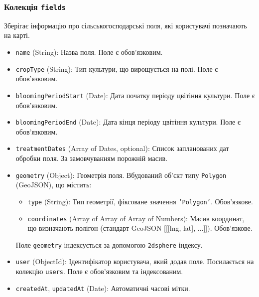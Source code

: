 \subsubsection*{Колекція \texttt{fields}}
Зберігає інформацію про сільськогосподарські поля, які користувачі позначають на карті.
\begin{itemize}
    \item \texttt{name} (String): Назва поля. Поле є обов'язковим.
    \item \texttt{cropType} (String): Тип культури, що вирощується на полі. Поле є обов'язковим.
    \item \texttt{bloomingPeriodStart} (Date): Дата початку періоду цвітіння культури. Поле є обов'язковим.
    \item \texttt{bloomingPeriodEnd} (Date): Дата кінця періоду цвітіння культури. Поле є обов'язковим.
    \item \texttt{treatmentDates} (Array of Dates, optional): Список запланованих дат обробки поля. За замовчуванням порожній масив.
    \item \texttt{geometry} (Object): Геометрія поля. Вбудований об'єкт типу \texttt{Polygon} (GeoJSON), що містить:
    \begin{itemize}
        \item \texttt{type} (String): Тип геометрії, фіксоване значення \texttt{'Polygon'}. Обов'язкове.
        \item \texttt{coordinates} (Array of Array of Array of Numbers): Масив координат, що визначають полігон (стандарт GeoJSON [[[lng, lat], ...]]). Обов'язкове.
    \end{itemize}
    Поле \texttt{geometry} індексується за допомогою \texttt{2dsphere} індексу.
    \item \texttt{user} (ObjectId): Ідентифікатор користувача, який додав поле. Посилається на колекцію \texttt{users}. Поле є обов'язковим та індексованим.
    \item \texttt{createdAt}, \texttt{updatedAt} (Date): Автоматичні часові мітки.
\end{itemize}

